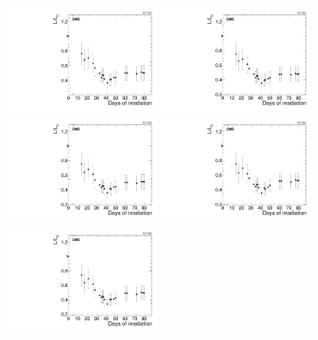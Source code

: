 \begin{figure}[tbp!]
\centering
\includegraphics[width=0.45\textwidth]{figures/SCSN81-F-20p8cm-f2ch0-time.pdf}
\includegraphics[width=0.45\textwidth]{figures/SCSN81-F-20p8cm-f4ch1-time.pdf}
\includegraphics[width=0.45\textwidth]{figures/SCSN81-F-20p8cm-f15ch2-time.pdf}
\includegraphics[width=0.45\textwidth]{figures/SCSN81-F-20p8cm-f15ch3-time.pdf}
\includegraphics[width=0.45\textwidth]{figures/SCSN81-F-20p8cm-f20ch2-time.pdf}

\end{figure}
